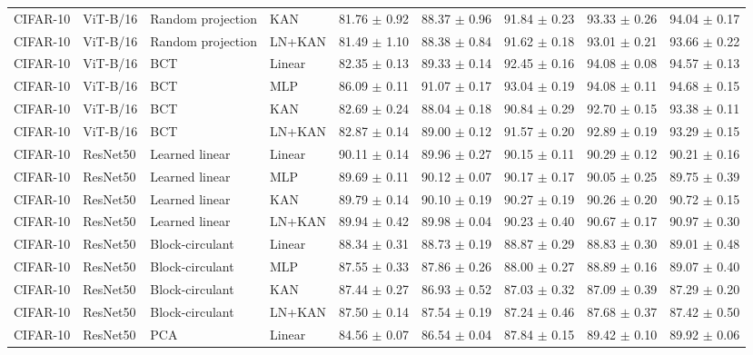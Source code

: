 \documentclass[10pt]{article}
\begin{document}
\begin{longtable}{llllccccc}
CIFAR-10 & ViT-B/16 & Random projection & KAN & 81.76 $\pm$ 0.92 & 88.37 $\pm$ 0.96 & 91.84 $\pm$ 0.23 & 93.33 $\pm$ 0.26 & 94.04 $\pm$ 0.17 \\
CIFAR-10 & ViT-B/16 & Random projection & LN+KAN & 81.49 $\pm$ 1.10 & 88.38 $\pm$ 0.84 & 91.62 $\pm$ 0.18 & 93.01 $\pm$ 0.21 & 93.66 $\pm$ 0.22 \\
CIFAR-10 & ViT-B/16 & BCT & Linear & 82.35 $\pm$ 0.13 & 89.33 $\pm$ 0.14 & 92.45 $\pm$ 0.16 & 94.08 $\pm$ 0.08 & 94.57 $\pm$ 0.13 \\
CIFAR-10 & ViT-B/16 & BCT & MLP & 86.09 $\pm$ 0.11 & 91.07 $\pm$ 0.17 & 93.04 $\pm$ 0.19 & 94.08 $\pm$ 0.11 & 94.68 $\pm$ 0.15 \\
CIFAR-10 & ViT-B/16 & BCT & KAN & 82.69 $\pm$ 0.24 & 88.04 $\pm$ 0.18 & 90.84 $\pm$ 0.29 & 92.70 $\pm$ 0.15 & 93.38 $\pm$ 0.11 \\
CIFAR-10 & ViT-B/16 & BCT & LN+KAN & 82.87 $\pm$ 0.14 & 89.00 $\pm$ 0.12 & 91.57 $\pm$ 0.20 & 92.89 $\pm$ 0.19 & 93.29 $\pm$ 0.15 \\
\midrule
CIFAR-10 & ResNet50 & Learned linear & Linear & 90.11 $\pm$ 0.14 & 89.96 $\pm$ 0.27 & 90.15 $\pm$ 0.11 & 90.29 $\pm$ 0.12 & 90.21 $\pm$ 0.16 \\
CIFAR-10 & ResNet50 & Learned linear & MLP & 89.69 $\pm$ 0.11 & 90.12 $\pm$ 0.07 & 90.17 $\pm$ 0.17 & 90.05 $\pm$ 0.25 & 89.75 $\pm$ 0.39 \\
CIFAR-10 & ResNet50 & Learned linear & KAN & 89.79 $\pm$ 0.14 & 90.10 $\pm$ 0.19 & 90.27 $\pm$ 0.19 & 90.26 $\pm$ 0.20 & 90.72 $\pm$ 0.15 \\
CIFAR-10 & ResNet50 & Learned linear & LN+KAN & 89.94 $\pm$ 0.42 & 89.98 $\pm$ 0.04 & 90.23 $\pm$ 0.40 & 90.67 $\pm$ 0.17 & 90.97 $\pm$ 0.30 \\
CIFAR-10 & ResNet50 & Block-circulant & Linear & 88.34 $\pm$ 0.31 & 88.73 $\pm$ 0.19 & 88.87 $\pm$ 0.29 & 88.83 $\pm$ 0.30 & 89.01 $\pm$ 0.48 \\
CIFAR-10 & ResNet50 & Block-circulant & MLP & 87.55 $\pm$ 0.33 & 87.86 $\pm$ 0.26 & 88.00 $\pm$ 0.27 & 88.89 $\pm$ 0.16 & 89.07 $\pm$ 0.40 \\
CIFAR-10 & ResNet50 & Block-circulant & KAN & 87.44 $\pm$ 0.27 & 86.93 $\pm$ 0.52 & 87.03 $\pm$ 0.32 & 87.09 $\pm$ 0.39 & 87.29 $\pm$ 0.20 \\
CIFAR-10 & ResNet50 & Block-circulant & LN+KAN & 87.50 $\pm$ 0.14 & 87.54 $\pm$ 0.19 & 87.24 $\pm$ 0.46 & 87.68 $\pm$ 0.37 & 87.42 $\pm$ 0.50 \\
CIFAR-10 & ResNet50 & PCA & Linear & 84.56 $\pm$ 0.07 & 86.54 $\pm$ 0.04 & 87.84 $\pm$ 0.15 & 89.42 $\pm$ 0.10 & 89.92 $\pm$ 0.06 \\

\end{longtable}
\end{document}
